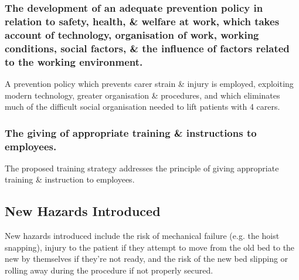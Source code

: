\documentclass[a4paper]{article}
\begin{document}
\begin{multicols}{2}
\subsubsection{The development of an adequate prevention policy in relation to safety, health, \& welfare at work, which takes account of technology, organisation of work, working conditions, social factors, \& the influence of factors related to the working environment.}
A prevention policy which prevents carer strain \& injury is employed, exploiting modern technology, greater
organisation \& procedures, and which eliminates much of the difficult social organisation needed to lift patients with
4 carers.

\subsubsection{The giving of appropriate training \& instructions to employees.}
The proposed training strategy addresses the principle of giving appropriate training \& instruction to employees.

\subsection{New Hazards Introduced}
New hazards introduced include the risk of mechanical failure (e.g. the hoist snapping), injury to the patient if they
attempt to move from the old bed to the new by themselves if they're not ready, and the risk of the new bed slipping or
rolling away during the procedure if not properly secured.

\printbibliography
\end{multicols}
\end{document}
